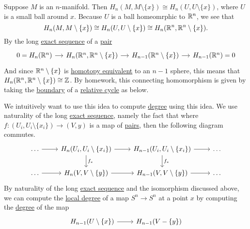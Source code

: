 Suppose \(M\) is an \(n\)-manifold. Then \(H_n(M, M \setminus \{x\}) \cong H_n(U, U \setminus \{x\})\), where \(U\) is a small ball around \(x\).
Because \(U\) is a ball homeomrphic to \(\mathbb{\MakeUppercase{r}} ^n\), we see that
\[
	H_n(M, M \setminus \{x\}) \cong H_n(U, U \setminus \{x\}) \cong H_n(\mathbb{\MakeUppercase{r}} ^n, \mathbb{\MakeUppercase{r}} ^n \setminus \{x\}).
\]
By the long \hyperref[def:exact-sequence]{exact sequence} of a \hyperref[def:good-pair]{pair}
\[
	\begin{tikzcd}[column sep=small]
		{0=H_n(\mathbb{R}^n)} & {H_n(\mathbb{R}^n, \mathbb{R}^n\setminus\{x\})} & {H_{n-1}(\mathbb{R}^n\setminus\{x\})} & {H_{n-1}(\mathbb{R}^n)=0}
		\arrow[from=1-1, to=1-2]
		\arrow[from=1-2, to=1-3]
		\arrow[from=1-3, to=1-4]
	\end{tikzcd}
\]
And since \(\mathbb{\MakeUppercase{r}}^n \setminus \{x\}\) is \hyperref[def:homotopy-equivalence]{homotopy equivalent} to an \(n - 1\) sphere, this means that
\(H_n(\mathbb{\MakeUppercase{r}} ^n, \mathbb{\MakeUppercase{r}} ^n \setminus \{x\}) \cong \mathbb{\MakeUppercase{z}} \). By homework, this
connecting homomorphism is given by taking the \hyperref[def:boundary]{boundary} of a \hyperref[def:relative-cycle]{relative cycle} as below.
\begin{figure}[H]
	\centering
	\label{fig:connecting-homomorphism-relative-homology-rn}
\end{figure}

We intuitively want to use this idea to compute \hyperref[def:degree]{degree} using this idea. We use naturality of the long \hyperref[def:exact-sequence]{exact sequence},
namely the fact that where \(f \colon (U_i, U_i \setminus \{x_i\}) \to (V, y)\) is a map of \hyperref[def:good-pair]{pairs}, then the following diagram commutes.
\[
	\begin{tikzcd}
		\ldots & {H_n(U_i, U_i\setminus\{x_i\})} & {H_{n-1}(U_i, U_i\setminus\{x_i\})} & \ldots \\
		\ldots & {H_n(V, V\setminus\{y\})} & {H_{n-1}(V, V\setminus\{y\})} & \ldots
		\arrow[from=1-1, to=1-2]
		\arrow[from=1-2, to=1-3]
		\arrow[from=1-3, to=1-4]
		\arrow["{f_\ast}", from=1-3, to=2-3]
		\arrow[from=2-3, to=2-4]
		\arrow[from=2-2, to=2-3]
		\arrow["{f_\ast}", from=1-2, to=2-2]
		\arrow[from=2-1, to=2-2]
	\end{tikzcd}
\]
By naturality of the long \hyperref[def:exact-sequence]{exact sequence} and the isomorphism discussed above, we can compute the \hyperref[def:local-degree]{local degree}
of a map \(S^n \to S^n\) at a point \(x\) by computing the \hyperref[def:degree]{degree} of the map
\[
	\begin{tikzcd}
		{H_{n-1}(U\setminus\{x\})} & {H_{n-1}(V-\{y\})}
		\arrow[from=1-1, to=1-2]
	\end{tikzcd}
\]

